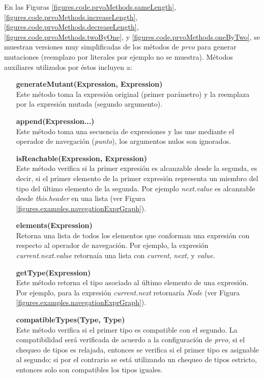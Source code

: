 En las Figuras \ref{figures.code.prvoMethods.sameLength}, \ref{figures.code.prvoMethods.increaseLength}, \ref{figures.code.prvoMethods.decreaseLength}, \ref{figures.code.prvoMethods.twoByOne}, y \ref{figures.code.prvoMethods.oneByTwo}, se muestran versiones muy simplificadas de los m\'etodos de \emph{prvo} para generar mutaciones (reemplazo por literales por ejemplo no se muestra). M\'etodos auxiliares utilizados por \'estos incluyen a:

\begin{enumerate}[leftmargin=.75cm,align=left]
	\item[\textbf{generateMutant(Expression, Expression)}]\mbox{}\\ Este m\'etodo toma la expresi\'on original (primer par\'ametro) y la reemplaza por la expresi\'on mutada (segundo argumento).
	
	\item[\textbf{append(Expression...)}]\mbox{}\\ Este m\'etodo toma una secuencia de expresiones y las une mediante el operador de navegaci\'on (\emph{punto}), los argumentos nulos son ignorados.
	
	\item[\textbf{isReachable(Expression, Expression)}]\mbox{}\\ Este m\'etodo verifica si la primer expresi\'on es alcanzable desde la segunda, es decir, si el primer elemento de la primer expresi\'on representa un miembro del tipo del \'ultimo elemento de la segunda. Por ejemplo \emph{next.value} es alcanzable desde \emph{this.header} en una lista (ver Figura \ref{figures.examples.navegationExprGraph}).
	
	\item[\textbf{elements(Expression)}]\mbox{}\\ Retorna una lista de todos los elementos que conforman una expresi\'on con respecto al operador de navegaci\'on. Por ejemplo, la expresi\'on \emph{current.next.value} retorna\'ia una lista con \emph{current}, \emph{next}, y \emph{value}.
	
	\item[\textbf{getType(Expression)}]\mbox{}\\ Este m\'etodo retorna el tipo asociado al \'ultimo elemento de una expresi\'on. Por ejemplo, para la expresi\'on \emph{current.next} retornar\'ia \emph{Node} (ver Figura \ref{figures.examples.navegationExprGraph}).
	
	\item[\textbf{compatibleTypes(Type, Type)}]\mbox{}\\ Este m\'etodo verifica si el primer tipo es compatible con el segundo. La compatibilidad ser\'a verificada de acuerdo a la configuraci\'on de \emph{prvo}, si el chequeo de tipos es relajada, entonces se verifica si el primer tipo es asignable al segundo; si por el contrario se est\'a utilizando un chequeo de tipos estricto, entonces solo son compatibles los tipos iguales.
	

\end{enumerate}
